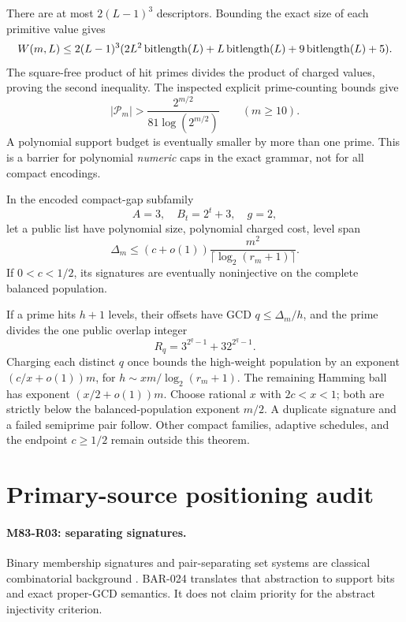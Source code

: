 \documentclass[11pt]{article}
\begin{document}
\begin{claimproof}
There are at most \(2(L-1)^3\) descriptors.  Bounding the exact size of
each primitive value gives
\[
 W(m,L)\le
 2(L-1)^3(2L^2\operatorname{bitlength}(L)+L\operatorname{bitlength}(L)+9\operatorname{bitlength}(L)+5).
\]
The square-free product of hit primes divides the product of charged values,
proving the second inequality.  The inspected explicit prime-counting
bounds give
\[
 |\mathcal P_m|>
 \frac{2^{m/2}}{81\log(2^{m/2})}\qquad(m\ge10).
\]
A polynomial support budget is eventually smaller by more than one prime.
This is a barrier for polynomial \emph{numeric} caps in the exact grammar,
not for all compact encodings.
\end{claimproof}

{}
In the encoded compact-gap subfamily
\[
 A=3,\quad B_t=2^t+3,\quad g=2,
\]
let a public list have polynomial size, polynomial charged cost, level span
\[
 \Delta_m\le(c+o(1))
 \frac{m^2}{\lceil\log_2(r_m+1)\rceil}.
\]
If \(0<c<1/2\), its signatures are eventually noninjective on the complete
balanced population.

\begin{claimproof}
If a prime hits \(h+1\) levels, their offsets have GCD
\(q\le\Delta_m/h\), and the prime divides the one public overlap integer
\[
 R_q=3^{2^q-1}+32^{2^q-1}.
\]
Charging each distinct \(q\) once bounds the high-weight population by an
exponent \((c/x+o(1))m\), for
\(h\sim xm/\log_2(r_m+1)\).  The remaining Hamming ball has exponent
\((x/2+o(1))m\).  Choose rational \(x\) with \(2c<x<1\); both are strictly
below the balanced-population exponent \(m/2\).  A duplicate signature and
a failed semiprime pair follow.  Other compact families, adaptive schedules,
and the endpoint \(c\ge1/2\) remain outside this theorem.
\end{claimproof}

\appendix

\section{Primary-source positioning audit}
\label{app:finite-source-positioning}

\paragraph{M83-R03: separating signatures.}
Binary membership signatures and pair-separating set systems are classical
combinatorial background \cite{katona1966separating}. BAR-024 translates
that abstraction to support bits and exact proper-GCD semantics. It does not
claim priority for the abstract injectivity criterion.
\end{document}
